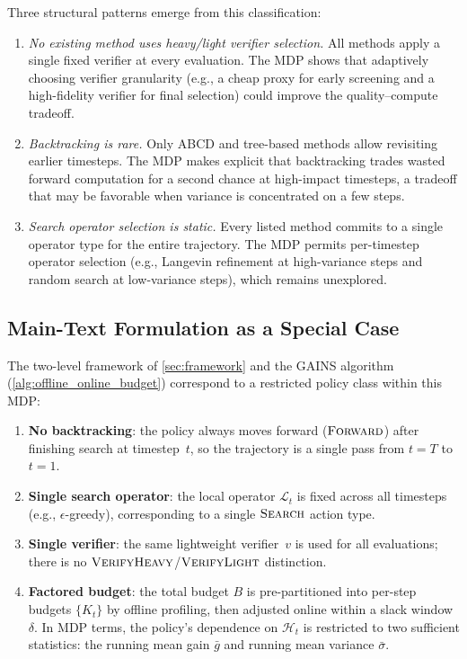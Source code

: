 Three structural patterns emerge from this classification:

\begin{enumerate}
  \item \emph{No existing method uses heavy/light verifier selection.}
    All methods apply a single fixed verifier at every evaluation.
    The MDP shows that adaptively choosing verifier
    granularity (e.g., a cheap proxy for early screening and a
    high-fidelity verifier for final selection) could improve the
    quality--compute tradeoff.

  \item \emph{Backtracking is rare.}
    Only ABCD and tree-based methods allow revisiting earlier timesteps.
    The MDP makes explicit that backtracking trades wasted forward
    computation for a second chance at high-impact timesteps, a tradeoff
    that may be favorable when variance is concentrated on a few steps.

  \item \emph{Search operator selection is static.}
    Every listed method commits to a single operator type for the entire
    trajectory.
    The MDP permits per-timestep operator selection (e.g., Langevin
    refinement at high-variance steps and random search at low-variance
    steps), which remains unexplored.
\end{enumerate}

\subsection{Main-Text Formulation as a Special Case}

The two-level framework of \cref{sec:framework} and the GAINS
algorithm (\cref{alg:offline_online_budget}) correspond to a restricted
policy class within this MDP:

\begin{enumerate}
  \item \textbf{No backtracking}: the policy always moves forward
    ($\textsc{Forward}$) after finishing search at timestep~$t$, so the
    trajectory is a single pass from $t = T$ to $t = 1$.
  \item \textbf{Single search operator}: the local operator
    $\mathcal{L}_t$ is fixed across all timesteps (e.g.,
    $\epsilon$-greedy), corresponding to a single
    $\textsc{Search}$ action type.
  \item \textbf{Single verifier}: the same lightweight verifier~$v$ is
    used for all evaluations; there is no
    $\textsc{VerifyHeavy}$/$\textsc{VerifyLight}$ distinction.
  \item \textbf{Factored budget}: the total budget $B$ is pre-partitioned
    into per-step budgets $\{K_t\}$ by offline profiling, then adjusted
    online within a slack window~$\delta$.
    In MDP terms, the policy's dependence on
    $\mathcal{H}_t$ is restricted to two sufficient statistics:
    the running mean gain $\bar{g}$ and running mean variance
    $\bar{\sigma}$.
\end{enumerate}

